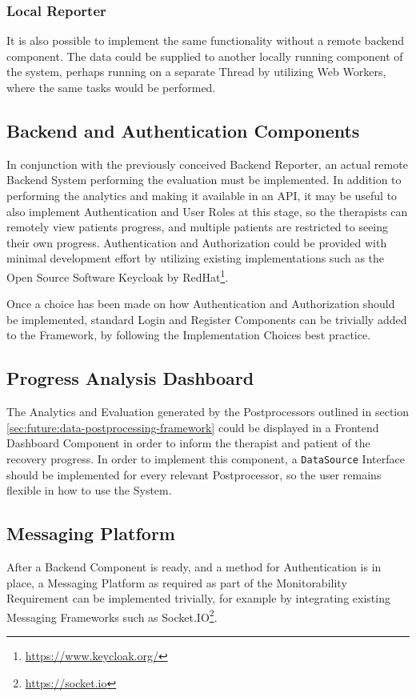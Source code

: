 \subsubsection{Local Reporter}
\label{sec:future:local-reporter}
It is also possible to implement the same functionality without a remote backend component. The data could be supplied to another locally running component of the system, perhaps running on a separate Thread by utilizing Web Workers, where the same tasks would be performed.

\subsection{Backend and Authentication Components}
In conjunction with the previously conceived Backend Reporter, an actual remote Backend System performing the evaluation must be implemented. In addition to performing the analytics and making it available in an API, it may be useful to also implement Authentication and User Roles at this stage, so the therapists can remotely view patients progress, and multiple patients are restricted to seeing their own progress. Authentication and Authorization could be provided with minimal development effort by utilizing existing implementations such as the Open Source Software Keycloak by RedHat\footnote{\url{https://www.keycloak.org/}}.

Once a choice has been made on how Authentication and Authorization should be implemented, standard Login and Register Components can be trivially added to the Framework, by following the Implementation Choices best practice.
\subsection{Progress Analysis Dashboard}
\label{sec:future:progress-analysis-dashboard}
The Analytics and Evaluation generated by the Postprocessors outlined in section \ref{sec:future:data-postprocessing-framework} could be displayed in a Frontend Dashboard Component in order to inform the therapist and patient of the recovery progress. In order to implement this component, a \texttt{DataSource} Interface should be implemented for every relevant Postprocessor, so the user remains flexible in how to use the System.
\subsection{Messaging Platform}
After a Backend Component is ready, and a method for Authentication is in place, a Messaging Platform as required as part of the Monitorability Requirement can be implemented trivially, for example by integrating existing Messaging Frameworks such as Socket.IO\footnote{\url{https://socket.io}}.

